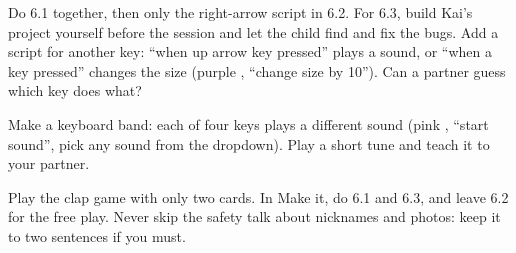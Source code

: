 \begin{differentiation}
\supportpath Do 6.1 together, then only the right-arrow script in 6.2. For 6.3, build Kai's project yourself before the session and let the child find and fix the bugs.
\extensionpath Add a script for another key: \enquote{when up arrow key pressed} plays a sound, or \enquote{when a key pressed} changes the size (purple , \enquote{change size by 10}). Can a partner guess which key does what?
\end{differentiation}

\begin{stretchchallenge}
Make a keyboard band: each of four keys plays a different sound (pink , \enquote{start sound}, pick any sound from the dropdown). Play a short tune and teach it to your partner.
\end{stretchchallenge}

\begin{teachernote}
Play the clap game with only two cards. In Make it, do 6.1 and 6.3, and leave 6.2 for the free play. Never skip the safety talk about nicknames and photos: keep it to two sentences if you must.
\end{teachernote}
